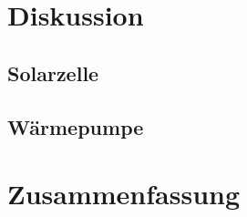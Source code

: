 \documentclass[english, ngerman]{scrartcl}
\begin{document}
\section{Diskussion}
\subsection{Solarzelle}
\label{subsec:diskussion_solar}

\subsection{Wärmepumpe}
\label{subsec:diskussion_waermepumpe}


\section{Zusammenfassung}
\label{sec:zusammenfassung}


\clearpage
\printbibliography

\listoffigures

\listoftables
\end{document}

